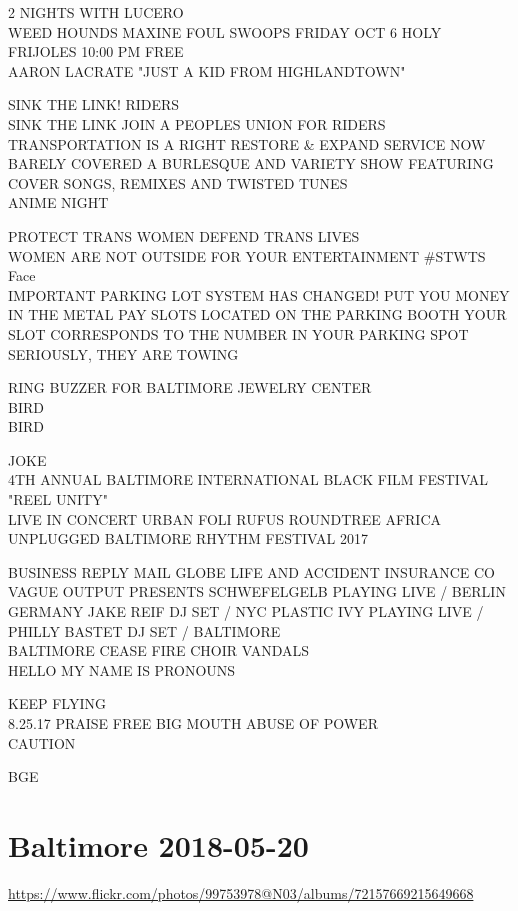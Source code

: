 \documentclass[10pt,letterpaper]{article}
\begin{document}
2 NIGHTS WITH LUCERO\\
WEED HOUNDS MAXINE FOUL SWOOPS FRIDAY OCT 6 HOLY FRIJOLES 10:00 PM FREE\\
AARON LACRATE "JUST A KID FROM HIGHLANDTOWN"

SINK THE LINK!  RIDERS\\
SINK THE LINK JOIN A PEOPLES UNION FOR RIDERS TRANSPORTATION IS A RIGHT RESTORE \& EXPAND SERVICE NOW\\
BARELY COVERED A BURLESQUE AND VARIETY SHOW FEATURING COVER SONGS, REMIXES AND TWISTED TUNES\\
ANIME NIGHT

PROTECT TRANS WOMEN DEFEND TRANS LIVES\\
WOMEN ARE NOT OUTSIDE FOR YOUR ENTERTAINMENT \#STWTS\\
Face\\
IMPORTANT PARKING LOT SYSTEM HAS CHANGED!  PUT YOU MONEY IN THE METAL PAY SLOTS LOCATED ON THE PARKING BOOTH YOUR SLOT CORRESPONDS TO THE NUMBER IN YOUR PARKING SPOT SERIOUSLY, THEY ARE TOWING

RING BUZZER FOR BALTIMORE JEWELRY CENTER\\
BIRD\\
BIRD

JOKE\\
4TH ANNUAL BALTIMORE INTERNATIONAL BLACK FILM FESTIVAL "REEL UNITY"\\
LIVE IN CONCERT URBAN FOLI RUFUS ROUNDTREE AFRICA UNPLUGGED BALTIMORE RHYTHM FESTIVAL 2017

BUSINESS REPLY MAIL GLOBE LIFE AND ACCIDENT INSURANCE CO\\
VAGUE OUTPUT PRESENTS SCHWEFELGELB  PLAYING LIVE / BERLIN GERMANY JAKE REIF DJ SET / NYC PLASTIC IVY PLAYING LIVE / PHILLY BASTET DJ SET / BALTIMORE\\
BALTIMORE CEASE FIRE CHOIR VANDALS\\
HELLO MY NAME IS PRONOUNS

KEEP FLYING\\
8.25.17 PRAISE FREE BIG MOUTH ABUSE OF POWER\\
CAUTION

BGE
\

\section*{Baltimore 2018-05-20}

\url{https://www.flickr.com/photos/99753978@N03/albums/72157669215649668}
\end{document}
